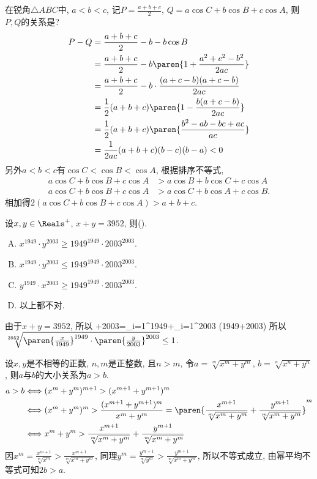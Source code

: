 \bq{}{}
在锐角$\triangle ABC$中, $a<b<c$, 记$P=\frac{a+b+c}{2}$, $Q=a\cos C+b\cos B+c\cos A$, 则$P,Q$的关系是?
\eq
\ba
\begin{align*}
 P-Q &= \frac{a+b+c}{2}-b-b\cos B\\
  &=\frac{a+b+c}{2}-b\paren{1+\frac{a^2+c^2-b^2}{2ac}}\\
  &=\frac{a+b+c}{2}-b\cdot\frac{(a+c-b)(a+c-b)}{2ac}\\
  &=\frac12(a+b+c)\paren{1-\frac{b(a+c-b)}{2ac}}\\
  &=\frac12(a+b+c)\paren{\frac{b^2-ab-bc+ac}{ac}}\\
  &=\frac{1}{2ac}(a+b+c)(b-c)(b-a)<0
\end{align*}
另外$a<b<c$有$\cos C<\cos B<\cos A$, 根据排序不等式, 
\begin{align*}
a\cos C+b\cos B+c\cos A&>a\cos B+b\cos C+c\cos A\\
a\cos C+b\cos B+c\cos A&>a\cos C+b\cos A+c\cos B.
\end{align*}
相加得$2(a\cos C+b\cos B+c\cos A)>a+b+c$.
\ea

\bq{}{}
设$x,y\in\Reals^+$, $x+y=3952$, 则(\qquad).

\begin{enumerate}[A.]
 \item $x^{1949}\cdot y^{2003}\ge1949^{1949}\cdot2003^{2003}$.
 \item $x^{1949}\cdot y^{2003}\le1949^{1949}\cdot2003^{2003}$.
 \item $y^{1949}\cdot x^{2003}\ge1949^{1949}\cdot2003^{2003}$.
 \item 以上都不对.
\end{enumerate}
\eq
\ba
由于$x+y=3952$, 所以
+2003=\sum_{i=1}^{1949}+\sum_{i=1}^{2003}
  \ge(1949+2003)
\eee
所以$\sqrt[3952]{\paren{\frac{x}{1949}}^{1949}\cdot\paren{\frac{y}{2003}}^{2003}}\le1$.
\ea

\bq{}{}
设$x,y$是不相等的正数, $n,m$是正整数, 且$n>m$, 令$a=\sqrt[m]{x^m+y^m}$, $b=\sqrt[n]{x^n+y^n}$, 
则$a$与$b$的大小关系为\underline{$a>b$}.
\eq
\ba
\begin{align*}
 a>b&\Longleftrightarrow (x^m+y^m)^{m+1}>(x^{m+1}+y^{m+1})^m\\
  &\Longleftrightarrow (x^m+y^m)^m>\frac{(x^{m+1}+y^{m+1})^{m}}{x^m+y^m}=\paren{\frac{x^{m+1}}{\sqrt[m]{x^m+y^m}}+\frac{y^{m+1}}{\sqrt[m]{x^m+y^m}}}^m\\
  &\Longleftrightarrow x^m+y^m>\frac{x^{m+1}}{\sqrt[m]{x^m+y^m}}+\frac{y^{m+1}}{\sqrt[m]{x^m+y^m}}
\end{align*}
因$x^m=\frac{x^{m+1}}{\sqrt[m]{x^m}}>\frac{x^{m+1}}{\sqrt[m]{x^m+y^m}}$, 
同理$y^m=\frac{y^{m+1}}{\sqrt[m]{y^m}}>\frac{y^{m+1}}{\sqrt[m]{x^m+y^m}}$,
所以不等式成立, 由幂平均不等式可知$2b>a$.
\ea

